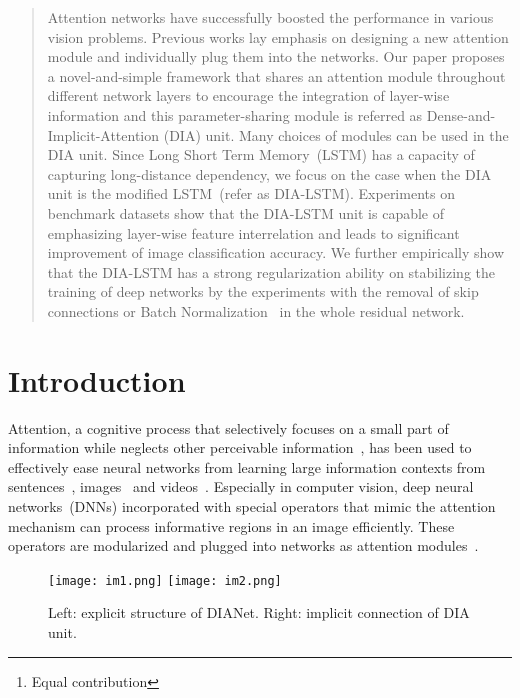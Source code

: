 \documentclass[letterpaper]{article} \usepackage{aaai20}  \usepackage{times}  \usepackage{helvet} \usepackage{courier}  \usepackage[hyphens]{url}  \usepackage{graphicx} \urlstyle{rm} \def\UrlFont{\rm}  \usepackage{graphicx}  \frenchspacing  \setlength{\pdfpagewidth}{8.5in}  \setlength{\pdfpageheight}{11in}  \usepackage{color}
\author{Zhongzhan Huang\textsuperscript{\rm 1}\thanks{Equal contribution},
Senwei Liang\textsuperscript{\rm 2}, Mingfu Liang\textsuperscript{\rm 3},
Haizhao Yang\textsuperscript{\rm 2,4}\\
\textsuperscript{\rm 1}{New Oriental AI Research Academy}\\
\textsuperscript{\rm 2}{National University of Singapore} \\
\textsuperscript{\rm 3}{Northwestern University}\\
\textsuperscript{\rm 4}{Purdue University}\\
hzz\_dedekinds@foxmail.com,\quad
liangsenwei@u.nus.edu,\\
mingfuliang2020@u.northwestern.edu,\quad
matyh@nus.edu.sg}
\begin{document}
\maketitle

\begin{abstract}
Attention networks have successfully boosted the performance in various vision problems.  Previous works lay emphasis on designing a new attention module and individually plug them into the networks. Our paper proposes a novel-and-simple framework that shares an attention module throughout different network layers to encourage the integration of layer-wise information and this parameter-sharing module is referred as Dense-and-Implicit-Attention (DIA) unit. Many choices of modules can be used in the DIA unit. Since Long Short Term Memory~(LSTM) has a capacity of capturing long-distance dependency, we focus on the case when the DIA unit is the modified LSTM~(refer as DIA-LSTM). Experiments on benchmark datasets show that the DIA-LSTM unit is capable of emphasizing layer-wise feature interrelation and leads to significant improvement of image classification accuracy. We further empirically show that the DIA-LSTM has a strong regularization ability on stabilizing the training of deep networks by the experiments with the removal of skip connections or Batch Normalization~\cite{Ioffe:2015:BNA:3045118.3045167} in the whole residual network. 
\end{abstract}

\section{Introduction}
	Attention, a cognitive process that selectively focuses on a small part of information while neglects other perceivable information~\cite{anderson2005cognitive}, has been used to effectively ease neural networks from learning large information contexts from sentences~\cite{vaswani2017attention,britz2017massive,cheng2016long}, images~\cite{Xu:2015:SAT:3045118.3045336,luong2015effective} and videos~\cite{miech2017learnable}. Especially in computer vision, deep neural networks~(DNNs) incorporated with special operators that mimic the attention mechanism can process informative regions in an image efficiently. These operators are modularized and plugged into networks as attention modules~\cite{hu2018squeeze,woo2018cbam,park2018bam,wang2018non,hu2018gather,cao2019GCNet}.
	\begin{figure}[htbp]
		\centering
		\texttt{[image: im1.png]}
		\hspace{.1in}
		\texttt{[image: im2.png]}
		\caption{Left: explicit structure of DIANet. Right: implicit connection of DIA unit.}
		\label{imp}
	\end{figure}
	
\end{document}
